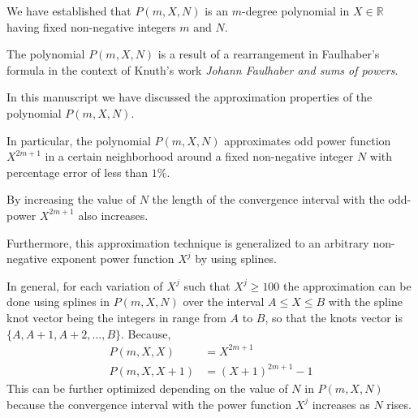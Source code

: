 We have established that $P(m, X, N)$ is an $m$-degree polynomial in $X\in\mathbb{R}$
having fixed non-negative integers $m$ and $N$.

The polynomial $P(m, X, N)$ is a result of a rearrangement in Faulhaber's formula
in the context of Knuth's work \textit{Johann Faulhaber and sums of powers}.

In this manuscript we have discussed the approximation properties of the polynomial $P(m,X,N)$.

In particular, the polynomial $P(m,X,N)$ approximates odd power function $X^{2m+1}$ in a certain neighborhood
around a fixed non-negative integer $N$ with percentage error of less than $1\%$.

By increasing the value of $N$ the length of the convergence interval with the odd-power $X^{2m+1}$ also increases.

Furthermore, this approximation technique is generalized to an arbitrary non-negative exponent power function $X^j$
by using splines.

In general, for each variation of $X^j$ such that $X^j \geq 100$ the approximation can be done using
splines in $P(m,X, N)$ over the interval $A \leq X \leq B$ with the spline knot vector being the integers in
range from $A$ to $B$, so that the knots vector is $\{A, A+1, A+2, \ldots, B \}$.
Because,
\begin{align*}
    P(m,X, X) &= X^{2m+1} \\
    P(m,X, X+1) &= (X+1)^{2m+1} - 1
\end{align*}
This can be further optimized depending on the value of $N$ in $P(m,X,N)$ because the convergence interval
with the power function $X^j$ increases as $N$ rises.
